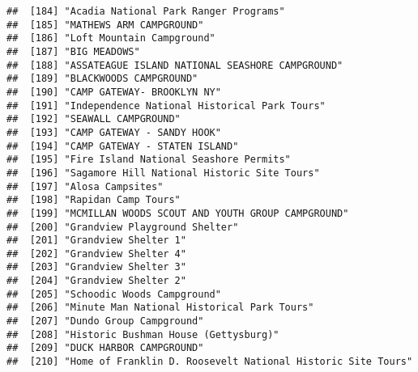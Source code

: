 \documentclass[
]{article}
\begin{document}
\begin{verbatim}
##  [184] "Acadia National Park Ranger Programs"                                                
##  [185] "MATHEWS ARM CAMPGROUND"                                                              
##  [186] "Loft Mountain Campground"                                                            
##  [187] "BIG MEADOWS"                                                                         
##  [188] "ASSATEAGUE ISLAND NATIONAL SEASHORE CAMPGROUND"                                      
##  [189] "BLACKWOODS CAMPGROUND"                                                               
##  [190] "CAMP GATEWAY- BROOKLYN NY"                                                           
##  [191] "Independence National Historical Park Tours"                                         
##  [192] "SEAWALL CAMPGROUND"                                                                  
##  [193] "CAMP GATEWAY - SANDY HOOK"                                                           
##  [194] "CAMP GATEWAY - STATEN ISLAND"                                                        
##  [195] "Fire Island National Seashore Permits"                                               
##  [196] "Sagamore Hill National Historic Site Tours"                                          
##  [197] "Alosa Campsites"                                                                     
##  [198] "Rapidan Camp Tours"                                                                  
##  [199] "MCMILLAN WOODS SCOUT AND YOUTH GROUP CAMPGROUND"                                     
##  [200] "Grandview Playground Shelter"                                                        
##  [201] "Grandview Shelter 1"                                                                 
##  [202] "Grandview Shelter 4"                                                                 
##  [203] "Grandview Shelter 3"                                                                 
##  [204] "Grandview Shelter 2"                                                                 
##  [205] "Schoodic Woods Campground"                                                           
##  [206] "Minute Man National Historical Park Tours"                                           
##  [207] "Dundo Group Campground"                                                              
##  [208] "Historic Bushman House (Gettysburg)"                                                 
##  [209] "DUCK HARBOR CAMPGROUND"                                                              
##  [210] "Home of Franklin D. Roosevelt National Historic Site Tours"                          

\end{verbatim}
\end{document}
